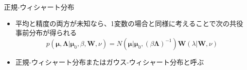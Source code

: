 \begin{frame}{正規-ウィシャート分布}
 \begin{itemize}
  \item \alert{平均と精度の両方が未知}なら、1変数の場合と同様に考えることで次の共役事前分布が得られる
        \begin{equation}
         p(\bm{\mu},\bm{\Lambda}|\bm{\mu}_0,\beta,\bm{W},\nu) = N(\bm{\mu}|\bm{\mu}_0,(\beta\bm{\Lambda})^{-1})\bm{W}(\lambda|\bm{W},\nu)
        \end{equation}
  \item \alert{正規-ウィシャート分布}または\alert{ガウス-ウィシャート分布}と呼ぶ
 \end{itemize}
\end{frame}
